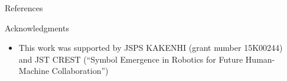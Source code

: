 \documentclass[final,hyperref={pdfpagelabels=false}]{beamer}
\begin{document}
\begin{frame}[t]
\begin{columns}[t]
\begin{column}{.3\textwidth}
    \begin{block}{References}
      \nocite{*} %
      \linespread{0.928}\selectfont
      \footnotesize{
      }
    \end{block}

    \begin{block}{Acknowledgments}
    \begin{itemize}
    \item This work was supported by JSPS KAKENHI (grant number 15K00244) and
JST CREST (“Symbol Emergence in Robotics for Future Human-Machine
Collaboration”)
    \end{itemize}
    \end{block}

  \end{column} %

  \begin{column}{.02\textwidth}\end{column} %

\end{columns} %

\end{frame} %
\end{document}
